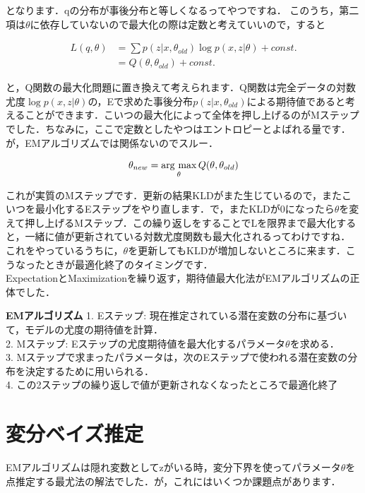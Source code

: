 \documentclass[11pt,a4paper]{ujreport}
\newcommand{\argmax}{\mathop{\rm arg~max}\limits}
\begin{document}
となります．qの分布が事後分布と等しくなるってやつですね．
このうち，第二項は$\theta$に依存していないので最大化の際は定数と考えていいので，すると

\begin{align}
  L(q,\theta) &= \sum p(z|x,\theta_{old})\log p(x,z|\theta) + const.\\
  &= Q(\theta, \theta_{old}) + const.
\end{align}

と，Q関数の最大化問題に置き換えて考えられます．Q関数は完全データの対数尤度$\log p(x,z|\theta)$の，Eで求めた事後分布$p(z|x,\theta_{old})$による期待値であると考えることができます．こいつの最大化によって全体を押し上げるのがMステップでした．ちなみに，ここで定数としたやつはエントロピーとよばれる量です．が，EMアルゴリズムでは関係ないのでスルー．

\begin{align}
  \theta_{new} = \argmax_{\theta}Q(\theta,\theta_{old})
\end{align}

これが実質のMステップです．更新の結果KLDがまた生じているので，またこいつを最小化するEステップをやり直します．で，またKLDが0になったら$\theta$を変えて押し上げるMステップ．この繰り返しをすることでLを限界まで最大化すると，一緒に値が更新されている対数尤度関数も最大化されるってわけですね．\\

これをやっているうちに，$\theta$を更新してもKLDが増加しないところに来ます．こうなったときが最適化終了のタイミングです．\\
ExpectationとMaximizationを繰り返す，期待値最大化法がEMアルゴリズムの正体でした．

\begin{screen}
  \textbf{EMアルゴリズム}
  1. Eステップ: 現在推定されている潜在変数の分布に基づいて，モデルの尤度の期待値を計算．\\
  2. Mステップ: Eステップの尤度期待値を最大化するパラメータ$\theta$を求める．\\
  3. Mステップで求まったパラメータは，次のEステップで使われる潜在変数の分布を決定するために用いられる．\\
  4. この2ステップの繰り返しで値が更新されなくなったところで最適化終了
\end{screen}

\section{変分ベイズ推定}
EMアルゴリズムは隠れ変数としてzがいる時，変分下界を使ってパラメータ$\theta$を点推定する最尤法の解法でした．が，これにはいくつか課題点があります．
\end{document}
